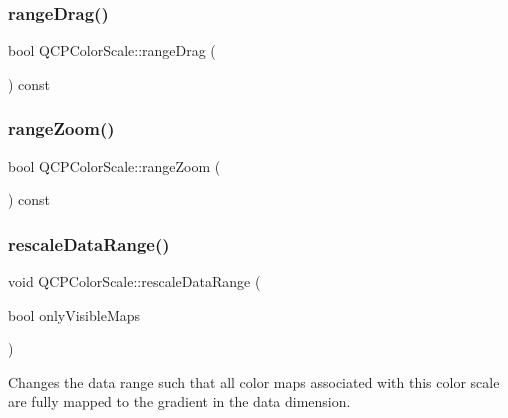 \mbox{\label{class_q_c_p_color_scale_a2a0670492f2a780596ea455ea8496a78}} 
\subsubsection{\texorpdfstring{range\+Drag()}{rangeDrag()}}
{\footnotesize\ttfamily bool Q\+C\+P\+Color\+Scale\+::range\+Drag (\begin{DoxyParamCaption}{ }\end{DoxyParamCaption}) const}

\mbox{\label{class_q_c_p_color_scale_adb4c3ada2b1e5ebbdead3b097064ff0b}} 
\subsubsection{\texorpdfstring{range\+Zoom()}{rangeZoom()}}
{\footnotesize\ttfamily bool Q\+C\+P\+Color\+Scale\+::range\+Zoom (\begin{DoxyParamCaption}{ }\end{DoxyParamCaption}) const}

\mbox{\label{class_q_c_p_color_scale_a425983db4478543924ddbd04ea20a356}} 
\subsubsection{\texorpdfstring{rescale\+Data\+Range()}{rescaleDataRange()}}
{\footnotesize\ttfamily void Q\+C\+P\+Color\+Scale\+::rescale\+Data\+Range (\begin{DoxyParamCaption}\item[{bool}]{only\+Visible\+Maps }\end{DoxyParamCaption})}

Changes the data range such that all color maps associated with this color scale are fully mapped to the gradient in the data dimension.

